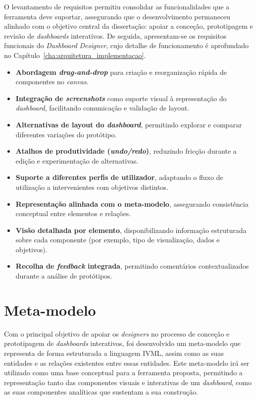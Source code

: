 O levantamento de requisitos permitiu consolidar as funcionalidades que a ferramenta deve suportar, assegurando que o desenvolvimento permaneceu alinhado com o objetivo central da dissertação: apoiar a conceção, prototipagem e revisão de \textit{dashboards} interativos. De seguida, apresentam-se os requisitos funcionais do \textit{Dashboard Designer}, cujo detalhe de funcionamento é aprofundado no Capítulo~\ref{cha:arquitetura_implementacao}.

\begin{itemize}
  \item \textbf{Abordagem \textit{drag-and-drop}} para criação e reorganização rápida de componentes no \textit{canvas}.
  \item \textbf{Integração de \textit{screenshots}} como suporte visual à representação do \textit{dashboard}, facilitando comunicação e validação de layout.
  \item \textbf{Alternativas de layout do \textit{dashboard}}, permitindo explorar e comparar diferentes variações do protótipo.
  \item \textbf{Atalhos de produtividade (\textit{undo/redo})}, reduzindo fricção durante a edição e experimentação de alternativas.
  \item \textbf{Suporte a diferentes perfis de utilizador}, adaptando o fluxo de utilização a intervenientes com objetivos distintos.
  \item \textbf{Representação alinhada com o meta-modelo}, assegurando consistência conceptual entre elementos e relações.
  \item \textbf{Visão detalhada por elemento}, disponibilizando informação estruturada sobre cada componente (por exemplo, tipo de visualização, dados e objetivos).
  \item \textbf{Recolha de \textit{feedback} integrada}, permitindo comentários contextualizados durante a análise de protótipos.
\end{itemize}

\section{Meta-modelo} %
\label{sec:meta_modelo}

Com o principal objetivo de apoiar os \textit{designers} no processo de conceção e prototipagem de \textit{dashboards} interativos, foi desenvolvido um meta-modelo que representa de forma estruturada a linguagem IVML, assim como as suas entidades e as relações existentes entre essas entidades. Este meta-modelo irá ser utilizado como uma base conceptual para a ferramenta proposta, permitindo a representação tanto das componentes visuais e interativas de um \textit{dashboard}, como as suas componentes analíticas que sustentam a sua construção.


